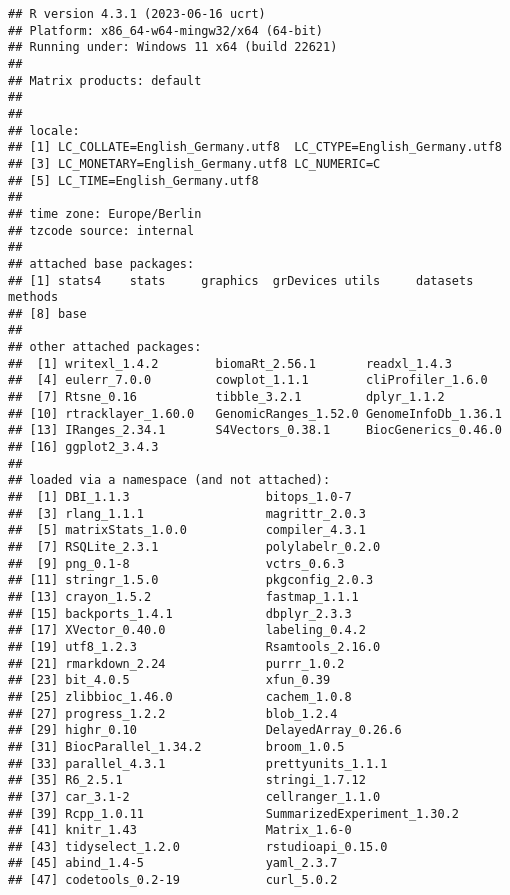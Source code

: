 \documentclass[
]{article}
\begin{document}
\begin{verbatim}
## R version 4.3.1 (2023-06-16 ucrt)
## Platform: x86_64-w64-mingw32/x64 (64-bit)
## Running under: Windows 11 x64 (build 22621)
## 
## Matrix products: default
## 
## 
## locale:
## [1] LC_COLLATE=English_Germany.utf8  LC_CTYPE=English_Germany.utf8   
## [3] LC_MONETARY=English_Germany.utf8 LC_NUMERIC=C                    
## [5] LC_TIME=English_Germany.utf8    
## 
## time zone: Europe/Berlin
## tzcode source: internal
## 
## attached base packages:
## [1] stats4    stats     graphics  grDevices utils     datasets  methods  
## [8] base     
## 
## other attached packages:
##  [1] writexl_1.4.2        biomaRt_2.56.1       readxl_1.4.3        
##  [4] eulerr_7.0.0         cowplot_1.1.1        cliProfiler_1.6.0   
##  [7] Rtsne_0.16           tibble_3.2.1         dplyr_1.1.2         
## [10] rtracklayer_1.60.0   GenomicRanges_1.52.0 GenomeInfoDb_1.36.1 
## [13] IRanges_2.34.1       S4Vectors_0.38.1     BiocGenerics_0.46.0 
## [16] ggplot2_3.4.3       
## 
## loaded via a namespace (and not attached):
##  [1] DBI_1.1.3                   bitops_1.0-7               
##  [3] rlang_1.1.1                 magrittr_2.0.3             
##  [5] matrixStats_1.0.0           compiler_4.3.1             
##  [7] RSQLite_2.3.1               polylabelr_0.2.0           
##  [9] png_0.1-8                   vctrs_0.6.3                
## [11] stringr_1.5.0               pkgconfig_2.0.3            
## [13] crayon_1.5.2                fastmap_1.1.1              
## [15] backports_1.4.1             dbplyr_2.3.3               
## [17] XVector_0.40.0              labeling_0.4.2             
## [19] utf8_1.2.3                  Rsamtools_2.16.0           
## [21] rmarkdown_2.24              purrr_1.0.2                
## [23] bit_4.0.5                   xfun_0.39                  
## [25] zlibbioc_1.46.0             cachem_1.0.8               
## [27] progress_1.2.2              blob_1.2.4                 
## [29] highr_0.10                  DelayedArray_0.26.6        
## [31] BiocParallel_1.34.2         broom_1.0.5                
## [33] parallel_4.3.1              prettyunits_1.1.1          
## [35] R6_2.5.1                    stringi_1.7.12             
## [37] car_3.1-2                   cellranger_1.1.0           
## [39] Rcpp_1.0.11                 SummarizedExperiment_1.30.2
## [41] knitr_1.43                  Matrix_1.6-0               
## [43] tidyselect_1.2.0            rstudioapi_0.15.0          
## [45] abind_1.4-5                 yaml_2.3.7                 
## [47] codetools_0.2-19            curl_5.0.2                 

\end{verbatim}
\end{document}
